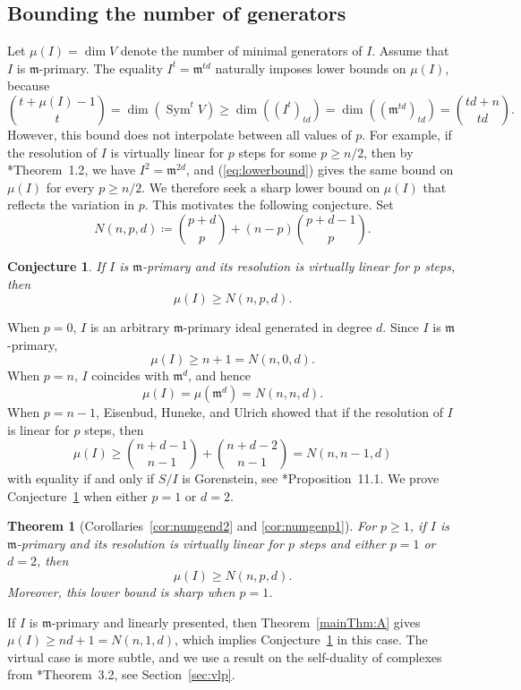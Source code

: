 \documentclass[11pt,letterpaper,reqno]{amsart}
\newcommand{\m}{\mathfrak{m}}
\newcommand{\Sym}{\operatorname{Sym}}
\newtheorem{conjecture}[theorem]{Conjecture}
\newtheorem{thmx}{Theorem}
\theoremstyle{definition}
\numberwithin{equation}{section}
\begin{document}
\subsection*{Bounding the number of generators}
Let $\mu(I) = \dim V$ denote the number of minimal generators of $I$. Assume that $I$ is $\m$-primary. The equality $I^t = \m^{td}$ naturally imposes lower bounds on $\mu(I)$, because
\begin{equation}\label{eq:lowerbound}
    \binom{t + \mu(I) - 1}{t} = \dim\left( \Sym^t V\right) \ge \dim\left( (I^t)_{td}\right) = \dim\left( (\m^{td})_{td}\right) = \binom{td + n}{td}.
\end{equation}
However, this bound does not interpolate between all values of $p$. For example, if the resolution of $I$ is virtually linear for $p$ steps for some $p \ge n/2$, then by \cite{yang}*{Theorem~1.2}, we have $I^2 = \m^{2d}$, and (\ref{eq:lowerbound}) gives the same bound on $\mu(I)$ for every $p \ge n/2$. We therefore seek a sharp lower bound on $\mu(I)$ that reflects the variation in $p$. This motivates the following conjecture. Set
\[N(n,p,d) \coloneqq \binom{p+d}{p} + (n-p)\binom{p+d-1}{p}.\]
\begin{conjecture}\label{conj:numgens}
    If $I$ is $\m$-primary and its resolution is virtually linear for $p$ steps, then
    \[\mu(I) \ge N(n,p,d).\]
\end{conjecture}
\noindent When $p = 0$, $I$ is an arbitrary $\m$-primary ideal generated in degree $d$. Since $I$ is $\m$-primary,
\[\mu(I) \ge n+1 = N(n,0,d).\]
When $p = n$, $I$ coincides with $\m^d$, and hence
\[\mu(I) = \mu(\m^d) = N(n,n,d).\]
When $p = n-1$, Eisenbud, Huneke, and Ulrich showed that if the resolution of $I$ is linear for $p$ steps, then
\[\mu(I) \ge \binom{n+d-1}{n-1} + \binom{n+d-2}{n-1} = N(n,n-1,d)\]
with equality if and only if $S/I$ is Gorenstein, see \cite{EHU}*{Proposition~11.1}. We prove Conjecture~\ref{conj:numgens} when either $p = 1$ or $d = 2$.
\begin{thmx}[Corollaries~\ref{cor:numgend2}\label{mainThm:numgens} and \ref{cor:numgenp1}]\label{thmC}
    For $p \ge 1$, if $I$ is $\m$-primary and its resolution is virtually linear for $p$ steps and either $p=1$ or $d=2$, then 
    \[\mu(I) \ge N(n,p,d).\]
    Moreover, this lower bound is sharp when $p = 1$.
\end{thmx}
\noindent
If $I$ is $\m$-primary and linearly presented, then Theorem~\ref{mainThm:A} gives $\mu(I)\ge nd+1 = N(n,1,d)$,
which implies Conjecture~\ref{conj:numgens} in this case. The virtual case is more subtle, and we use a result on the self-duality of complexes from \cite{RSWY}*{Theorem~3.2}, see Section~\ref{sec:vlp}.
\end{document}
